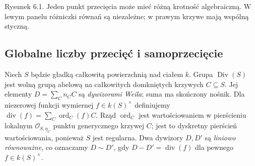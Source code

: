 \begin{center}
\begin{minipage}{\linewidth}
\centering
{}

{\small Rysunek 6.1. Jeden punkt przecięcia może mieć różną krotność algebraiczną. W lewym panelu różniczki równań są niezależne; w prawym krzywe mają wspólną styczną.}\par
\end{minipage}
\end{center}

\subsection{Globalne liczby przecięć i samoprzecięcie}

\begin{definicja}
\label{def:ga6-divisor-group}
Niech $S$ będzie gładką całkowitą powierzchnią nad ciałem $k$.
Grupa $\operatorname{Div}(S)$ jest wolną grupą abelową na
całkowitych domkniętych krzywych $C\subseteq S$. Jej elementy
$D=\sum_C n_C C$ są \emph{dywizorami Weila}; suma ma skończony
nośnik. Dla niezerowej funkcji wymiernej $f\in k(S)^\times$
definiujemy $\operatorname{div}(f)=\sum_C\operatorname{ord}_C(f)C$.
Rząd $\operatorname{ord}_C$ jest wartościowaniem w pierścieniu lokalnym
$\mathcal O_{S,\eta_C}$ punktu generycznego krzywej $C$;
jest to dyskretny pierścień wartościowania, ponieważ $S$ jest
regularna. Dwa dywizory $D,D'$ są \emph{liniowo równoważne},
co oznaczamy $D\sim D'$, gdy $D-D'=\operatorname{div}(f)$
dla pewnego $f\in k(S)^\times$.
\end{definicja}


